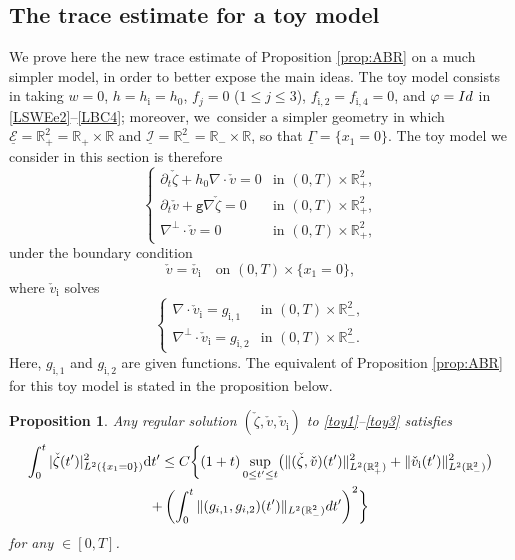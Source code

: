 \documentclass[11pt]{article}
\newcommand{\gr}{{\mathtt g}}
\newcommand{\R}{{\mathbb R}}
\newcommand{\dt}{\partial_t}
\newcommand{\ul}[1]{\underline{#1}}
\newcommand{\itGamma}{\mathit{\Gamma}}
\newtheorem{proposition}[theorem]{Proposition}
\theoremstyle{definition}
\begin{document}
\subsection{The trace estimate for a toy model}
We prove here the new trace estimate of Proposition \ref{prop:ABR} on a much simpler model, in order to better expose the main ideas.
The toy model consists in taking $w=0$, $h=h_\mathrm{i}=h_0$, $f_j=0$ ($1\leq j\leq 3$), $f_\mathrm{i,2}=f_\mathrm{i,4}=0$,
and $\varphi={\rm Id}$ in \eqref{LSWEe2}--\eqref{LBC4};
moreover, we~consider a simpler geometry in which $\ul{\mathcal E}=\R^2_+=\R_+\times \R$ and $\ul{\mathcal I}=\R^2_-=\R_-\times \R$,
so that $\ul{\itGamma}=\{x_1=0\}$.
The toy model we consider in this section is therefore
\begin{equation}\label{toy1}
\begin{cases}
\dt \check{\zeta}+h_0\nabla\cdot \check{v}=0 &\text{in } (0,T)\times \R^2_+, \\
\dt \check{v}+\gr \nabla \check{\zeta}=0 &\text{in } (0,T)\times \R^2_+, \\
\nabla^\perp\cdot\check{v}=0 &\text{in } (0,T)\times \R^2_+,
\end{cases}
\end{equation}
under the boundary condition
\begin{equation}\label{toy2}
\check{v}=\check{v_\mathrm{i}} \quad\text{on } (0,T)\times \{x_1=0\},
\end{equation}
where $\check{v}_\mathrm{i}$ solves
\begin{equation}\label{toy3}
\begin{cases}
\nabla\cdot \check{v}_\mathrm{i}=g_\mathrm{i,1} &\text{in } (0,T)\times \R^2_-, \\
\nabla^\perp\cdot \check{v}_\mathrm{i}=g_\mathrm{i,2} &\text{in } (0,T)\times \R^2_-.
\end{cases}
\end{equation}
Here, $g_\mathrm{i,1} $ and $g_\mathrm{i,2} $ are given functions.
The equivalent of Proposition \ref{prop:ABR} for this toy model is stated in the proposition below.

\begin{proposition}\label{prop:ABRtoy}
Any regular solution $(\check{\zeta},\check{v}, \check{v}_\mathrm{i})$ to \eqref{toy1}--\eqref{toy3} satisfies
\begin{multline*}
\int_0^t|\check{\zeta}(t')|_{L^2(\{x_1=0\})}^2\mathrm{d}t'
\leq C \biggl\{ (1+t)\sup_{0\leq t'\leq t}\bigl(\|(\check{\zeta},\check{v})(t')\|_{L^2({\R^2_+})}^2
+ \|\check{v}_\mathrm{i}(t')\|_{L^2(\R^2_-)}^2 \bigr) \\
+ \left(\int_0^t
\|(g_{{\rm i},1},g_{{\rm i},2})(t')\|_{L^2(\R^2_-)} {\rm d}t' \right)^2 \biggr\}
\end{multline*}
for any $\in[0,T]$.
\end{proposition}
\end{document}
